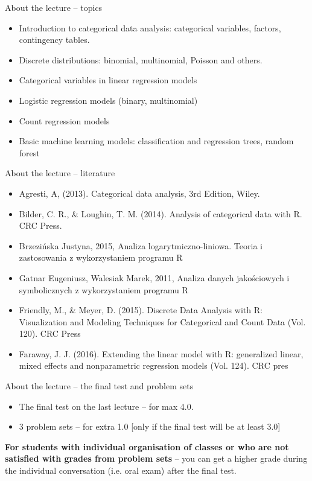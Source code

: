 \documentclass[10pt,ignorenonframetext,aspectratio=169]{beamer}
\begin{document}
\begin{frame}{About the lecture -- topics}
\begin{itemize}
    \item Introduction to categorical data analysis: categorical variables, factors, contingency tables.
    \item Discrete distributions: binomial, multinomial, Poisson and others.	
    \item Categorical variables in linear regression models	
    \item Logistic regression models (binary, multinomial)	
    \item Count regression models	
    \item Basic machine learning models: classification and regression trees, random forest	
\end{itemize}
\end{frame}

\begin{frame}{About the lecture -- literature}
    \begin{itemize}
        \item Agresti, A, (2013). Categorical data analysis, 3rd Edition, Wiley.
        \item Bilder, C. R., \& Loughin, T. M. (2014). Analysis of categorical data with R. CRC Press.
        \item Brzezińska Justyna, 2015, Analiza logarytmiczno-liniowa. Teoria i zastosowania z wykorzystaniem programu R
        \item Gatnar Eugeniusz, Walesiak Marek, 2011, Analiza danych jakościowych i symbolicznych z wykorzystaniem programu R
        \item Friendly, M., \& Meyer, D. (2015). Discrete Data Analysis with R: Visualization and Modeling Techniques for Categorical and Count Data (Vol. 120). CRC Press
        \item Faraway, J. J. (2016). Extending the linear model with R: generalized linear, mixed effects and nonparametric regression models (Vol. 124). CRC pres
    \end{itemize}
\end{frame}

\begin{frame}{About the lecture -- the final test and problem sets}
\begin{itemize}
    \item The final test on the last lecture -- for max 4.0.
    \item 3 problem sets -- for extra 1.0 [only if the final test will be at least 3.0]
\end{itemize}
\vspace{1cm}
\textbf{For students with individual organisation of classes or who are not satisfied with grades from problem sets} -- you can get a higher grade during the individual conversation (i.e. oral exam) after the final test.
\end{frame}
\end{document}
